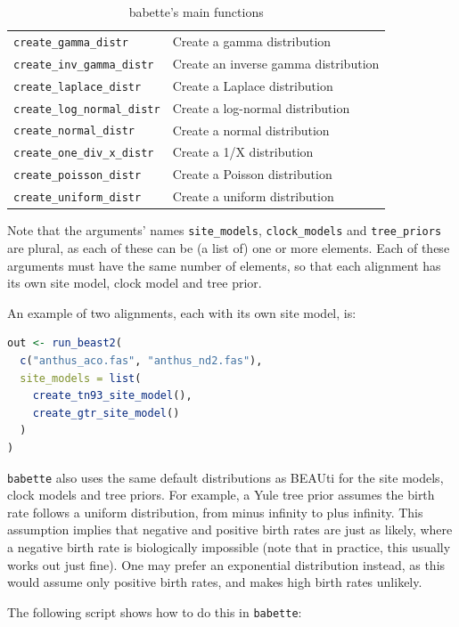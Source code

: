 \documentclass{article}
\begin{document}
\begin{table}[]
\begin{tabular}{ | l | l | }
\verb;create_gamma_distr; & Create a gamma distribution \\
\verb;create_inv_gamma_distr; & Create an inverse gamma distribution \\
\verb;create_laplace_distr; & Create a Laplace distribution \\
\verb;create_log_normal_distr; & Create a log-normal distribution \\
\verb;create_normal_distr; & Create a normal distribution \\
\verb;create_one_div_x_distr; & Create a 1/X distribution \\
\verb;create_poisson_distr; & Create a Poisson distribution \\
\verb;create_uniform_distr; & Create a uniform distribution \\
\hline
\end{tabular}
\caption{babette's main functions}
\label{tab:functions}
\end{table}

Note that the arguments' names \verb;site_models;, \verb;clock_models; 
and \verb;tree_priors; are plural, as each of these
can be (a list of) one or more elements. Each of these arguments must 
have the same number of elements, so that each alignment has its
own site model, clock model and tree prior. 

An example of two alignments, each with its own site model, is:

\begin{lstlisting}[language=R, caption=Two alignments, label=lst:two_alignments, floatplacement=H]
out <- run_beast2(
  c("anthus_aco.fas", "anthus_nd2.fas"),
  site_models = list(
    create_tn93_site_model(), 
    create_gtr_site_model()
  )
)
\end{lstlisting}

\verb;babette; also uses the same default distributions as BEAUti 
for the site models, clock models and tree priors. 
For example, a Yule tree prior assumes the birth rate follows a uniform distribution, 
from minus infinity to plus infinity. 
This assumption implies that negative and positive birth rates are just as likely, 
where a negative birth rate is biologically impossible (note that 
in practice, this usually works out just fine).
One may prefer an exponential distribution instead, 
as this would assume only positive birth rates, 
and makes high birth rates unlikely.

The following script shows how to do this in \verb;babette;:
\end{document}
